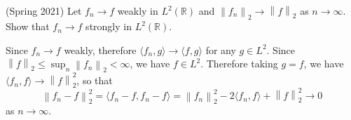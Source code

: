 \documentclass{exam}
\theoremstyle{problemstyle}
\newcommand{\norm}[1]{\left\lVert#1\right\rVert} %
\newcommand{\1}[1]{\textbf{1}_{\left[#1\right]}} %
\def\R{\mathbb{R}} %
\begin{document}
\begin{questions}
\question (Spring 2021) Let $f_n \to f$ weakly in $L^2(\R)$ and $\norm{f_n}_2 \to \norm{f}_2$ as $n\to\infty$. Show that $f_n\to f$ strongly in $L^2(\R)$.

\begin{solution}
Since $f_n\to f$ weakly, therefore $\langle f_n, g \rangle \to \langle f, g \rangle$ for any $g\in L^2$. Since $\norm{f}_2 \leq \sup_{n}\norm{f_n}_2 <\infty$, we have $f\in L^2$. Therefore taking $g=f$, we have $\langle f_n,f\rangle \to \norm{f}_2^2$, so that
\begin{equation*}
\norm{f_n-f}_2^2 = \langle f_n-f,f_n-f\rangle = \norm{f_n}_2^2 -2 \langle f_n,f\rangle + \norm{f}^2_2 \to 0
\end{equation*}
as $n\to \infty$.
\end{solution}









\end{questions}
\end{document}
